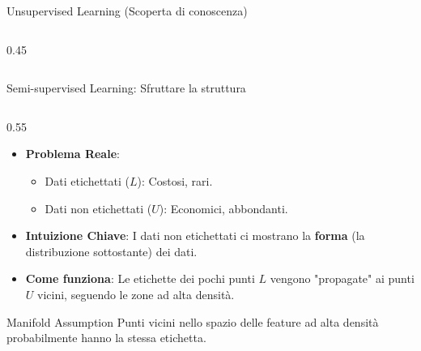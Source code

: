 \documentclass[aspectratio=169, 10pt]{beamer}
\begin{document}
\begin{frame}{Unsupervised Learning (Scoperta di conoscenza)}
\begin{columns}[T]
\begin{column}{0.45\textwidth}
        \end{column}
    \end{columns}
\end{frame}

\begin{frame}{Semi-supervised Learning: Sfruttare la struttura}
    \begin{columns}[T]
        \begin{column}{0.55\textwidth}
            \vspace{0.5em}
            \begin{itemize}
                \item \textbf{Problema Reale}:
                \begin{itemize}
                    \item Dati etichettati ($L$): Costosi, rari.
                    \item Dati non etichettati ($U$): Economici, abbondanti.
                \end{itemize}
                \item \textbf{Intuizione Chiave}:
                I dati non etichettati ci mostrano la \textbf{forma} (la distribuzione sottostante) dei dati.
                \item \textbf{Come funziona}:
                Le etichette dei pochi punti $L$ vengono "propagate" ai punti $U$ vicini, seguendo le zone ad alta densità.
            \end{itemize}
            \vspace{0.5em}
            \begin{alertblock}{Manifold Assumption}
                Punti vicini nello spazio delle feature ad alta densità probabilmente hanno la stessa etichetta.
            \end{alertblock}
        \end{column}


\end{columns}
\end{frame}
\end{document}
